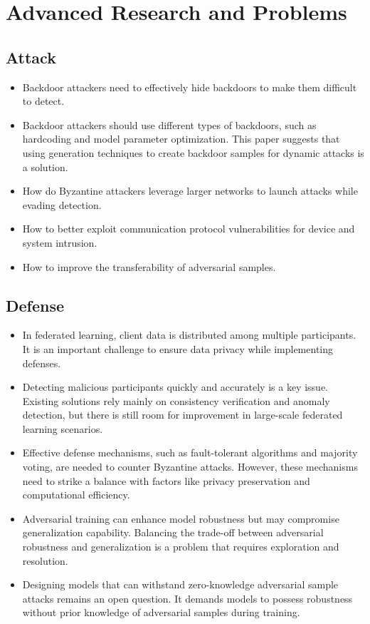 \documentclass[conference]{IEEEtran}
\begin{document}
\section{Advanced Research and Problems}  
\subsection{Attack}  
\begin{itemize}
    \item Backdoor attackers need to effectively hide backdoors to make them difficult to detect.
    \item Backdoor attackers should use different types of backdoors, such as hardcoding and model parameter optimization.  This paper suggests that using generation techniques to create backdoor samples for dynamic attacks is a solution.
    \item How do Byzantine attackers leverage larger networks to launch attacks while evading detection.  
    \item How to better exploit communication protocol vulnerabilities for device and system intrusion.  
    \item How to improve the transferability of adversarial samples.
\end{itemize}

\subsection{Defense}
\begin{itemize}
    \item In federated learning, client data is distributed among multiple participants. It is an important challenge to ensure data privacy while implementing defenses.  
    \item Detecting malicious participants quickly and accurately is a key issue. Existing solutions rely mainly on consistency verification and anomaly detection, but there is still room for improvement in large-scale federated learning scenarios.  
    \item Effective defense mechanisms, such as fault-tolerant algorithms and majority voting, are needed to counter Byzantine attacks. However, these mechanisms need to strike a balance with factors like privacy preservation and computational efficiency.
    \item Adversarial training can enhance model robustness but may compromise generalization capability. Balancing the trade-off between adversarial robustness and generalization is a problem that requires exploration and resolution.
    \item Designing models that can withstand zero-knowledge adversarial sample attacks remains an open question. It demands models to possess robustness without prior knowledge of adversarial samples during training.
\end{itemize}
\end{document}
